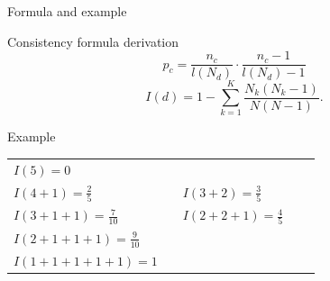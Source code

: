 \documentclass[aspectratio=43]{beamer}
\begin{document}
\begin{frame}{Formula and example}
\begin{block}{Consistency formula derivation}
\begin{equation}
	p_c = \frac{n_c}{l(N_d)} \cdot \frac{n_c - 1}{l(N_d) - 1}
\end{equation}
\begin{equation}\label{eq:metric}
	I(d)=1-\sum_{k=1}^K\dfrac{N_k(N_k-1)}{N(N-1)}.
\end{equation}

\end{block}
\begin{block}{Example}

\begin{tabular}{lclcl}
	$I(5)=0$ \\ $I(4+1)=\frac{2}{5}$ & & $I(3+2)=\frac{3}{5}$\\
	$I(3+1+1)=\frac{7}{10}$ && $I(2+2+1)=\frac{4}{5}$ \\
    $I(2+1+1+1)=\frac{9}{10}$\\
	$I(1+1+1+1+1)=1$
\end{tabular}

\end{block}
\end{frame}
\end{document}

